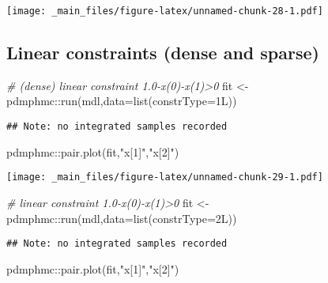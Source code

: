 \documentclass[
]{book}
\newenvironment{Shaded}{\begin{snugshade}}{\end{snugshade}}
\newcommand{\AttributeTok}[1]{\textcolor[rgb]{0.77,0.63,0.00}{#1}}
\newcommand{\CommentTok}[1]{\textcolor[rgb]{0.56,0.35,0.01}{\textit{#1}}}
\newcommand{\FunctionTok}[1]{\textcolor[rgb]{0.00,0.00,0.00}{#1}}
\newcommand{\NormalTok}[1]{#1}
\newcommand{\OtherTok}[1]{\textcolor[rgb]{0.56,0.35,0.01}{#1}}
\newcommand{\SpecialCharTok}[1]{\textcolor[rgb]{0.00,0.00,0.00}{#1}}
\newcommand{\StringTok}[1]{\textcolor[rgb]{0.31,0.60,0.02}{#1}}
\begin{document}
\texttt{[image: \_main\_files/figure-latex/unnamed-chunk-28-1.pdf]}

\hypertarget{linear-constraints-dense-and-sparse}{%
\subsection{Linear constraints (dense and sparse)}\label{linear-constraints-dense-and-sparse}}

\begin{Shaded}
\begin{Highlighting}[]
\CommentTok{\# (dense) linear constraint 1.0{-}x(0){-}x(1)\textgreater{}0}
\NormalTok{fit }\OtherTok{\textless{}{-}}\NormalTok{ pdmphmc}\SpecialCharTok{::}\FunctionTok{run}\NormalTok{(mdl,}\AttributeTok{data=}\FunctionTok{list}\NormalTok{(}\AttributeTok{constrType=}\NormalTok{1L))}
\end{Highlighting}
\end{Shaded}

\begin{verbatim}
## Note: no integrated samples recorded
\end{verbatim}

\begin{Shaded}
\begin{Highlighting}[]
\NormalTok{pdmphmc}\SpecialCharTok{::}\FunctionTok{pair.plot}\NormalTok{(fit,}\StringTok{"x[1]"}\NormalTok{,}\StringTok{"x[2]"}\NormalTok{)}
\end{Highlighting}
\end{Shaded}

\texttt{[image: \_main\_files/figure-latex/unnamed-chunk-29-1.pdf]}

\begin{Shaded}
\begin{Highlighting}[]
\CommentTok{\# linear constraint 1.0{-}x(0){-}x(1)\textgreater{}0}
\NormalTok{fit }\OtherTok{\textless{}{-}}\NormalTok{ pdmphmc}\SpecialCharTok{::}\FunctionTok{run}\NormalTok{(mdl,}\AttributeTok{data=}\FunctionTok{list}\NormalTok{(}\AttributeTok{constrType=}\NormalTok{2L))}
\end{Highlighting}
\end{Shaded}

\begin{verbatim}
## Note: no integrated samples recorded
\end{verbatim}

\begin{Shaded}
\begin{Highlighting}[]
\NormalTok{pdmphmc}\SpecialCharTok{::}\FunctionTok{pair.plot}\NormalTok{(fit,}\StringTok{"x[1]"}\NormalTok{,}\StringTok{"x[2]"}\NormalTok{)}
\end{Highlighting}
\end{Shaded}
\end{document}
